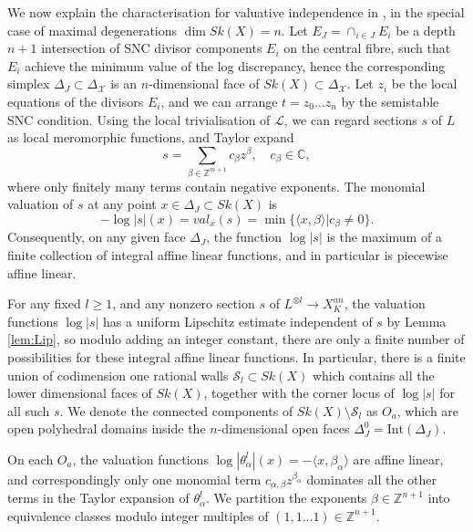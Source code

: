 \documentclass[a4paper]{article}
\theoremstyle{definition}
\newcommand{\C}{\mathbb{C}}
\newcommand{\Z}{\mathbb{Z}}
\begin{document}
	



We now explain the characterisation for valuative independence in \cite[Section 3.2]{Litheta}, in the special case of maximal degenerations $\dim Sk(X)=n$. Let $E_J=\cap_{i\in J} E_i$ be a depth $n+1$ intersection of SNC divisor components $E_i$ on the central fibre, such that $E_i$ achieve the minimum value of the log discrepancy, hence the corresponding simplex $\Delta_J\subset \Delta_{\mathcal{X}}$ is an $n$-dimensional face of $Sk(X)\subset \Delta_{\mathcal{X}}$. 
Let $z_i$ be the local equations of the divisors $E_i$, and we can arrange $t=z_0\ldots z_n$ by the semistable SNC condition. Using the local trivialisation of $\mathcal{L}$, we can regard sections $s$ of $L$ as local meromorphic functions, and Taylor expand
\[
s=\sum_{ \beta\in \Z^{m+1} } c_\beta z^\beta, \quad c_\beta\in \C,
\]
where only finitely many terms contain negative exponents.
The monomial valuation of $s$ at any point $x\in \Delta_J\subset Sk(X)$ is
\[
-\log 
|s|(x)=val_x(s) = \min \{    \langle x,\beta \rangle |  c_\beta \neq 0  \}. 
\]
Consequently, on any given face $\Delta_J$, the function $\log |s|$ is the maximum of a finite collection of integral affine linear functions, and in particular is piecewise affine linear.












For any fixed $l\geq 1$, and any nonzero section $s$ of $L^{\otimes l}\to X_K^{an}$, 
the valuation functions $\log |s|$ has a uniform Lipschitz estimate independent of $s$ by Lemma \ref{lem:Lip}, so modulo adding an integer constant, there are only a finite number of possibilities for these integral affine linear functions. In particular, there is a finite union of codimension one rational walls $\mathcal{S}_l\subset Sk(X)$ which contains all the lower dimensional faces of $Sk(X)$, together with the corner locus of $\log |s|$ for all such  $s$. We denote the connected components of $Sk(X)\setminus \mathcal{S}_l$ as $O_a$, which are open polyhedral domains inside the $n$-dimensional open faces $\Delta_J^0= \text{Int}(\Delta_J)$. 



On each $O_a$, the valuation functions $\log |\theta_\alpha^l |(x)=-\langle x, \beta_\alpha\rangle $ are affine linear, and correspondingly only one monomial term $c_{\alpha, \beta} z^{\beta_\alpha}$ dominates all the other terms in the Taylor expansion of $\theta^l_\alpha$.  We partition the exponents $\beta \in \Z^{n+1}$ into equivalence classes modulo integer multiples of $(1,1\ldots 1)\in \Z^{n+1}$.
\end{document}
